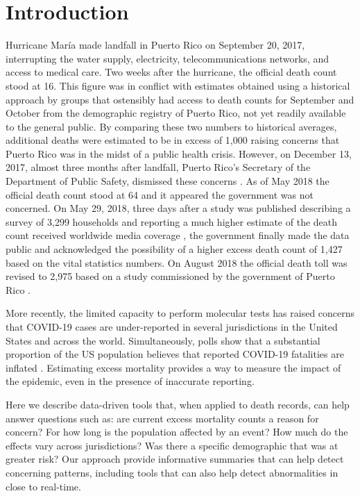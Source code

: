 \documentclass[11pt]{article}
\begin{document}
\newpage

\section{Introduction}
\label{sec:introduction}
Hurricane Mar\'ia made landfall in Puerto Rico on September 20, 2017, interrupting the water supply, electricity, telecommunications networks, and access to medical care\cite{updates2018puerto, rogers2017puerto}. Two weeks after the hurricane, the official death count stood at 16\cite{hoyos2018puerto}. This figure was in conflict with estimates obtained using a historical approach by groups that ostensibly had access to death counts for September and October from the demographic registry of Puerto Rico, not yet readily available to the general public. By comparing these two numbers to historical averages, additional deaths were estimated to be in excess of 1,000 \cite{santos2018use, robles2017official, rivera2018estimating, pascual2017nearly} raising concerns that Puerto Rico was in the midst of a public health crisis. However, on December 13, 2017, almost three months after landfall, Puerto Rico’s Secretary of the Department of Public Safety, dismissed these concerns \cite{robles2017official}. As of May 2018 the official death count stood at 64 \cite{hoyos2018puerto} and it appeared the government was not concerned. On May 29, 2018, three days after a study was published describing a survey of 3,299 households and reporting a much higher estimate of the death count received worldwide media coverage \cite{kishore2018mortality}, the government finally made the data public and acknowledged the possibility of a higher excess death count of 1,427 \cite{report2019} based on the vital statistics numbers. On August 2018 the official death toll was revised to 2,975 based on a study commissioned by the government of Puerto Rico \cite{santos2018differential}.

More recently, the limited capacity to perform molecular tests has raised concerns that COVID-19 cases are under-reported in several jurisdictions in the United States and across the world. Simultaneously, polls show that a substantial proportion of the US population believes that reported COVID-19 fatalities are inflated \cite{talev2020}. Estimating excess mortality provides a way to measure the impact of the epidemic, even in the presence of inaccurate reporting.


Here we describe data-driven tools that, when applied to death records, can help answer questions such as: are current excess mortality counts a reason for concern? For how long is the population affected by an event?  How much do the effects vary across jurisdictions?  Was there a specific demographic that was at greater risk? Our approach provide informative summaries that can help detect concerning patterns, including tools that can also help detect abnormalities in close to real-time. 
\end{document}
